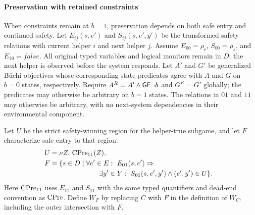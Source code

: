 \paragraph{Preservation with retained constraints}
When constraints remain at $b=1$, preservation depends on both
safe entry and continued safety.
Let $E_{ij}(s,e')$ and $S_{ij}(s,e',y')$ be the transformed safety
relations with current helper $i$ and next helper $j$.
Assume $E_{00}=\rho_e$, $S_{00}=\rho_s$, and $E_{10}=\mathit{false}$.
All original typed variables and logical monitors remain in $D$;
the next helper is observed before the system responds.
Let $A'$ and $G'$ be generalized B\"uchi objectives whose corresponding
state predicates agree with $A$ and $G$ on $b=0$ states, respectively.
Require $A^R=A'\land\mathsf{G}\mathsf{F}\neg b$ and $G^R=G'$ globally;
the predicates may otherwise be arbitrary on $b=1$ states.
The relations in $01$ and $11$ may otherwise be arbitrary, with
no next-system dependencies in their environmental component.

Let $U$ be the strict safety-winning region for the helper-true
subgame, and let $F$ characterize safe entry to that region:
\begin{align}
 U &= \nu Z.\,\CPre_{11}(Z),\label{eq:helper-U}\\
 F &= \{s\in D\mid\forall e'\in E:\ E_{01}(s,e')\Rightarrow{}\nonumber\\
   &\hspace{25mm}\exists y'\in Y:\ S_{01}(s,e',y')\land(e',y')\in U\}.
 \label{eq:helper-F}
\end{align}
Here $\operatorname{CPre}_{11}$ uses $E_{11}$ and $S_{11}$ with the same typed
quantifiers and dead-end convention as $\operatorname{CPre}$.
Define $W_F$ by replacing $C$ with $F$ in the definition of $W_C$,
including the outer intersection with $F$.


